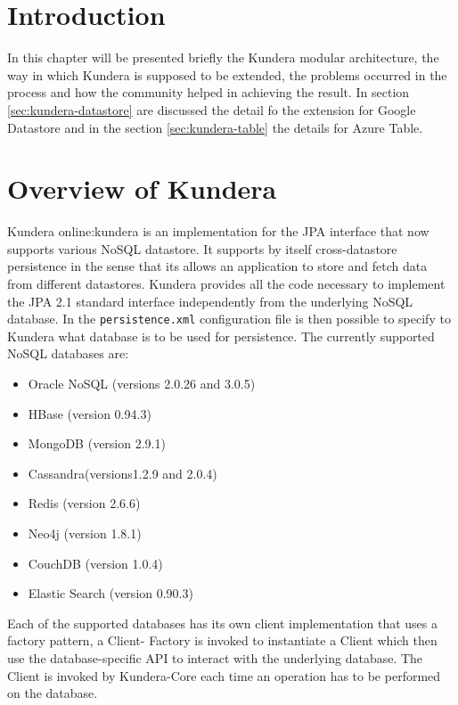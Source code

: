 \section{Introduction}
In this chapter will be presented briefly the Kundera modular architecture, the way in which Kundera is supposed to be extended, the problems occurred in the process and how the community helped in achieving the result.
In section \ref{sec:kundera-datastore} are discussed the detail fo the extension for Google Datastore and in the section \ref{sec:kundera-table} the details for Azure Table.

\section{Overview of Kundera}
Kundera \cite{book:projpa2}{online:kundera} is an implementation for the JPA interface that now supports various NoSQL datastore. It supports by itself cross-datastore persistence in the sense that its allows an application to store and fetch data from different datastores.
Kundera provides all the code necessary to implement the JPA 2.1 standard interface independently from the underlying NoSQL database. In the \texttt{persistence.xml} configuration file is then possible to specify to Kundera what database is to be used for persistence.
The currently supported NoSQL databases are:
\begin{itemize}
\item Oracle NoSQL (versions 2.0.26 and 3.0.5)
\item HBase (version 0.94.3)
\item MongoDB (version 2.9.1)
\item Cassandra(versions1.2.9 and 2.0.4)
\item Redis (version 2.6.6)
\item Neo4j (version 1.8.1)
\item CouchDB (version 1.0.4)
\item Elastic Search (version 0.90.3)
\end{itemize}

Each of the supported databases has its own client implementation that uses a factory pattern, a Client- Factory is invoked to instantiate a Client which then use the database-specific API to interact with the underlying database.
The Client is invoked by Kundera-Core each time an operation has to be performed on the database. 


